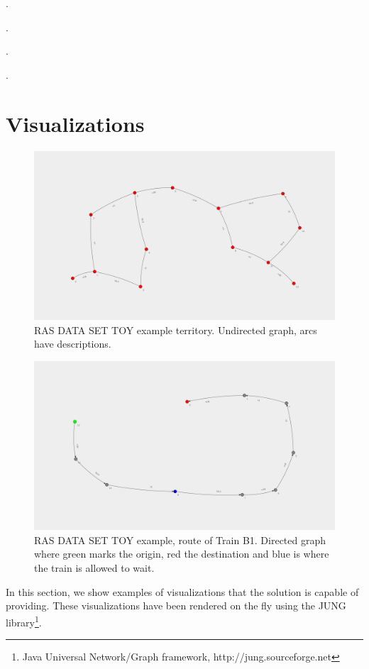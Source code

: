 \documentclass[10pt,a4paper,draft]{article}
\begin{document}
.

.

.

.

\section{Visualizations}

\begin{figure}
\centering
\includegraphics[width=150mm,angle=90]{solution.png}
\caption{RAS DATA SET TOY example territory. Undirected graph, arcs have descriptions.}
\end{figure}

\begin{figure}
\includegraphics[width=150mm,angle=90]{B1.png}
\centering
\caption{RAS DATA SET TOY example, route of Train B1. Directed graph where green marks the origin, red the destination and blue is where the train is allowed to wait.}
\end{figure}

In this section, we show examples of visualizations that the solution is capable of providing. These visualizations have been rendered on the fly using the JUNG library\footnote{Java Universal Network/Graph framework, http://jung.sourceforge.net}.
\end{document}
